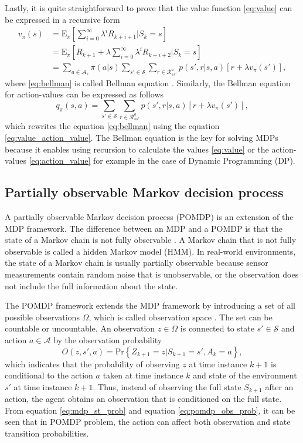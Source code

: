 \documentclass[english, 12pt, a4paper, elec, utf8, a-1b, online]{aaltothesis}
\newcommand{\Epolicy}[1]{\mathrm{E}_\pi \left[ #1 \right]}
\newcommand{\Ss}{\mathcal{S}}
\newcommand{\As}{\mathcal{A}}
\newcommand{\Rs}{\mathcal{R}}
\newcommand{\Os}{\Omega}
\newcommand{\Op}{O}
\renewcommand{\Pr}[1]{\text{Pr}\left\{ #1 \right\}}
\begin{document}
Lastly, it is quite straightforward to prove that the value function \eqref{eq:value} can be expressed in a recursive form 
\begin{align}
    v_\pi(s) 
    &= \Epolicy{ \sum_{i=0}^{\infty} \lambda^i R_{k + i + 1} | S_k=s} \\
    &= \Epolicy{R_{k + 1} + \lambda \sum_{i=0}^{\infty} \lambda^i R_{k + i + 2} | S_k=s} \\
    &= \sum_{a \in \As_s} \pi(a | s) \sum_{s' \in \Ss} \sum_{r \in \Rs_{ss'}^a} p(s', r | s, a) \left[ r + \lambda v_\pi(s') \right]\label{eq:bellman},
\end{align}
where \eqref{eq:bellman} is called Bellman equation \cite{Sutton2018}.
Similarly, the Bellman equation for action-values can be expressed as follows
\begin{equation}\label{eq:bellman_action}
     q_\pi(s, a) = \sum_{s' \in \Ss} \sum_{r \in \Rs_{ss'}^a} p(s', r | s, a) \left[ r + \lambda v_\pi(s') \right],
\end{equation}
which rewrites the equation \eqref{eq:bellman} using the equation \eqref{eq:value_action_value}.
The Bellman equation is the key for solving MDPs because it enables using recursion to calculate the values \eqref{eq:value} or the action-values \eqref{eq:action_value} for example in the case of Dynamic Programming (DP).


\subsection{Partially observable Markov decision process} \label{sec:POMDP}


A partially observable Markov decision process (POMDP) is an extension of the MDP framework. 
The difference between an MDP and a POMDP is that the state of a Markov chain is not fully observable \cite{Krishnamurthy2016}.
A Markov chain that is not fully observable is called a hidden Markov model (HMM).
In real-world environments, the state of a Markov chain is usually partially observable because sensor measurements contain random noise that is unobservable, or the observation does not include the full information about the state.

The POMDP framework extends the MDP framework by introducing a set of all possible observations $\Os$, which is called observation space \cite{Krishnamurthy2016}.
The set can be countable or uncountable.
An observation $z \in \Os$ is connected to state $s' \in \Ss$ and action $a \in \As$ by the observation probability
\begin{equation}\label{eq:pomdp_obs_prob}
    \Op(z , s', a) = \Pr{Z_{k+1}=z | S_{k+1}=s', A_k=a},
\end{equation}
which indicates that the probability of observing $z$ at time instance $k+1$ is conditional to the action $a$ taken at time instance $k$ and state of the environment $s'$ at time instance $k+1$.
Thus, instead of observing the full state $S_{k+1}$ after an action, the agent obtains an observation that is conditioned on the full state.
From equation \eqref{eq:mdp_st_prob} and equation \eqref{eq:pomdp_obs_prob}, it can be seen that in POMDP problem, the action can affect both observation and state transition probabilities.
\end{document}
